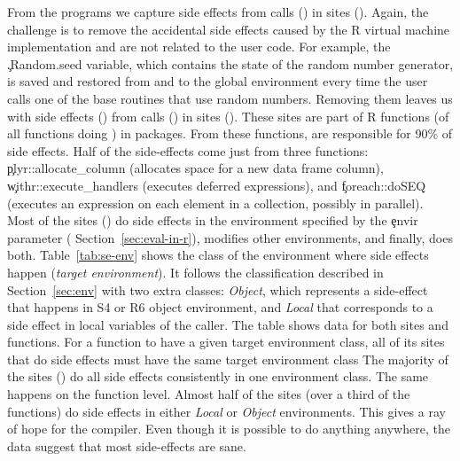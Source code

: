 \documentclass[review,screen,acmsmall,anonymous=true]{acmart}
\begin{document}
From the \packageNbrunsRnd programs we capture \SEAllRnd side effects from
\SEAllCallsRnd \eval calls (\SEUserCallsToAllRatio) in \SEAllSites sites
(\SEUserSitesToAllRatio). Again, the challenge is to remove the accidental
side effects caused by the R virtual machine implementation and are not
related to the user code. For example, the \c{.Random.seed} variable, which
contains the state of the random number generator, is saved and restored from
and to the global environment every time the user calls one of the base
routines that use random numbers.
%
%
Removing them leaves us with \SEUserRnd side effects (\SEUserRatio) from
\SEUserCallsRnd \eval calls (\SEUserCallsRatio) in \SEUserSites sites
(\SEUserSitesRatio). These sites are part of \SEUserFunctions R functions
(\SEUserFunctionsToAllRatio of all functions doing \eval) in \SEUserPackages
packages. From these functions, \SEFunsNighty are responsible for 90\% of side
effects. Half of the side-effects come just from three functions:
\c{plyr::allocate\_column} (allocates space for a new data frame column),
\c{withr::execute\_handlers} (executes deferred expressions), and
\c{foreach::doSEQ} (executes an expression on each element in a collection,
possibly in parallel). Most of the \eval sites (\SESitesInEnvirRatio) do side
effects in the environment specified by the \c{envir} parameter (\cf
Section~\ref{sec:eval-in-r}), \SESitesNotInEnvirRatio modifies other
environments, and finally, \SESitesBothEnvirRatio does both.
Table~\ref{tab:se-env} shows the class of the environment where \eval side
effects happen (\emph{target environment}). It follows the classification
described in Section~\ref{sec:env} with two extra classes: \emph{Object},
which represents a side-effect that happens in S4 or R6 object environment, and
\emph{Local} that corresponds to a side effect in local variables of the \eval
caller. The table shows data for both \eval sites and functions. For a
function to have a given target environment class, all of its \eval sites that
do side effects must have the same target environment class The majority of the
\eval sites (\SESitesInOneClass) do all side effects consistently in one
environment class. The same happens on the function level. Almost half of the
sites (over a third of the functions) do side effects in either \emph{Local} or
\emph{Object} environments. This gives a ray of hope for the compiler. Even
though it is possible to do anything anywhere, the data suggest that most
side-effects are sane.
\end{document}
